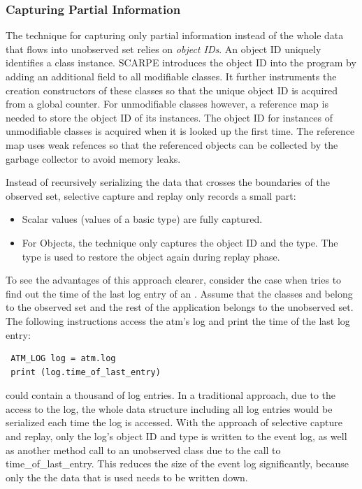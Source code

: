 \subsubsection{Capturing Partial Information}
The technique for capturing only partial information instead of the whole data that flows into unobserved set relies on \emph{object IDs}. An object ID uniquely identifies a class instance. SCARPE introduces the object ID into the program by adding an additional field to all modifiable classes. It further instruments the creation constructors of these classes so that the unique object ID is acquired from a global counter. For unmodifiable classes however, a reference map is needed to store the object ID of its instances. The object ID for instances of unmodifiable classes is acquired when it is looked up the first time. The reference map uses weak refences so that the referenced objects can be collected by the garbage collector to avoid memory leaks.

Instead of recursively serializing the data that crosses the boundaries of the observed set, selective capture and replay only records a small part:
\begin{itemize}
 \item Scalar values (values of a basic type) are fully captured.
 \item For Objects, the technique only captures the object ID and the type. The type is used to restore the object again during replay phase.
\end{itemize}

To see the advantages of this approach clearer, consider the case when  tries to find out the time of the last log entry of an . Assume that the classes  and  belong to the observed set and the rest of the application belongs to the unobserved set. The following instructions access the atm's log and print the time of the last log entry:
\javalisting
\begin{lstlisting}
 ATM_LOG log = atm.log
 print (log.time_of_last_entry)
\end{lstlisting}
 could contain a thousand of log entries. In a traditional approach, due to the access to the log, the whole data structure including all log entries would be serialized each time the log is accessed. With the approach of selective capture and replay, only the log's object ID and type is written to the event log, as well as another method call to an unobserved class due to the call to time\_of\_last\_entry. This reduces the size of the event log significantly, because only the the data that is used needs to be written down.

